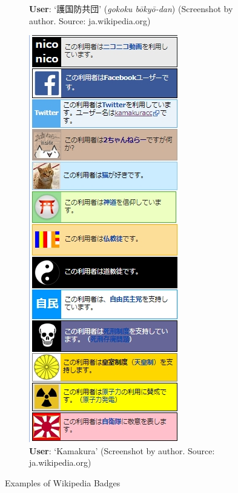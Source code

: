 \documentclass[10pt,british,A4paper,,openany]{memoir}
\begin{document}
\begin{figure}[!htb]
\begin{subfigure}[b]{0.3\textwidth}
  \caption{\textbf{User}: `護国防共団' (\textit{gokoku bōkyō-dan}) (Screenshot by author. Source: ja.wikipedia.org)}
  \label{fig:defense-corps}
 \end{subfigure}
 \begin{subfigure}[b]{0.3\textwidth}
  \includegraphics[width=\textwidth]{images/wiki/kamakura.jpg}
  \caption{\textbf{User}: `Kamakura' (Screenshot by author. Source: ja.wikipedia.org)}
  \label{fig:kamakura}
 \end{subfigure}
 \caption{Examples of Wikipedia Badges}\label{fig:badge-examples}
\end{figure}
\end{document}
